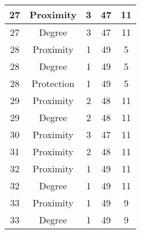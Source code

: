 \documentclass[results.tex]{subfiles}
\begin{document}
\begin{center}
\begin{tabular}{| c || c | c | c | c |}
            \hline
            27                      & Proximity                    & 3                      & 47                      & 11                   \\
            \hline
            27                      & Degree                       & 3                      & 47                      & 11                   \\
            \hline
            28                      & Proximity                    & 1                      & 49                      & 5                    \\
            \hline
            28                      & Degree                       & 1                      & 49                      & 5                    \\
            \hline
            28                      & Protection                   & 1                      & 49                      & 5                    \\
            \hline
            29                      & Proximity                    & 2                      & 48                      & 11                   \\
            \hline
            29                      & Degree                       & 2                      & 48                      & 11                   \\
            \hline
            30                      & Proximity                    & 3                      & 47                      & 11                   \\
            \hline
            31                      & Proximity                    & 2                      & 48                      & 11                   \\
            \hline
            32                      & Proximity                    & 1                      & 49                      & 11                   \\
            \hline
            32                      & Degree                       & 1                      & 49                      & 11                   \\
            \hline
            33                      & Proximity                    & 1                      & 49                      & 9                    \\
            \hline
            33                      & Degree                       & 1                      & 49                      & 9                    \\

\end{tabular}
\end{center}
\end{document}
